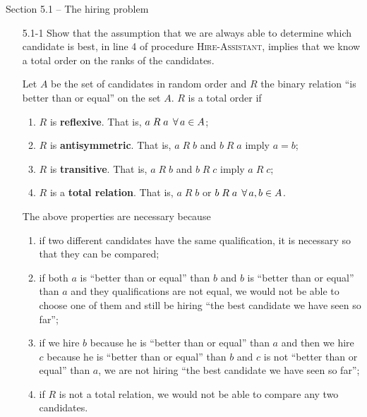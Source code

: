 
{\large Section 5.1 {--} The hiring problem}

\begin{enumerate}

\item[5.1{-}1]{Show that the assumption that we are always able to determine
which candidate is best, in line 4 of procedure \textsc{Hire-Assistant}, implies
that we know a total order on the ranks of the candidates.}

\begin{framed}
Let $A$ be the set of candidates in random order and $R$ the binary relation
``is better than or equal'' on the set $A$. $R$ is a total order if
\begin{enumerate}
  \item $R$ is \textbf{reflexive}. That is, $a\;R\;a \; \operatorname{\forall} a \in A$;
  \item $R$ is \textbf{antisymmetric}. That is, $a\;R\;b$ and $b\;R\;a$ imply $a = b$;
  \item $R$ is \textbf{transitive}. That is, $a\;R\;b$ and $b\;R\;c$ imply $a\;R\;c$;
  \item $R$ is a \textbf{total relation}. That is, $a\;R\;b$ or $b\;R\;a \; \operatorname{\forall} a, b \in A$.
\end{enumerate}

The above properties are necessary because
  \begin{enumerate}
    \item if two different candidates have the same qualification, it is
      necessary so that they can be compared;
    \item if both $a$ is ``better than or equal'' than $b$ and $b$ is ``better
      than or equal'' than $a$ and they qualifications are not equal, we would
      not be able to choose one of them and still be hiring ``the best candidate
      we have seen so far'';
    \item if we hire $b$ because he is ``better than or equal'' than $a$ and
      then we hire $c$ because he is ``better than or equal'' than $b$ and $c$
      is not ``better than or equal'' than $a$, we are not hiring ``the best
      candidate we have seen so far'';
    \item if $R$ is not a total relation, we would not be able to compare any
      two candidates.
\end{enumerate}
\end{framed}


\end{enumerate}
